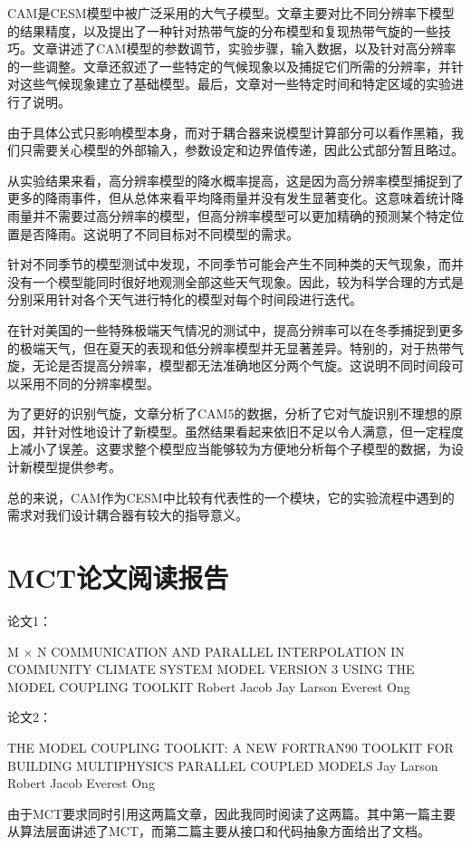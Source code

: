 CAM是CESM模型中被广泛采用的大气子模型。文章主要对比不同分辨率下模型的结果精度，以及提出了一种针对热带气旋的分布模型和复现热带气旋的一些技巧。文章讲述了CAM模型的参数调节，实验步骤，输入数据，以及针对高分辨率的一些调整。文章还叙述了一些特定的气候现象以及捕捉它们所需的分辨率，并针对这些气候现象建立了基础模型。最后，文章对一些特定时间和特定区域的实验进行了说明。

由于具体公式只影响模型本身，而对于耦合器来说模型计算部分可以看作黑箱，我们只需要关心模型的外部输入，参数设定和边界值传递，因此公式部分暂且略过。

从实验结果来看，高分辨率模型的降水概率提高，这是因为高分辨率模型捕捉到了更多的降雨事件，但从总体来看平均降雨量并没有发生显著变化。这意味着统计降雨量并不需要过高分辨率的模型，但高分辨率模型可以更加精确的预测某个特定位置是否降雨。这说明了不同目标对不同模型的需求。

针对不同季节的模型测试中发现，不同季节可能会产生不同种类的天气现象，而并没有一个模型能同时很好地观测全部这些天气现象。因此，较为科学合理的方式是分别采用针对各个天气进行特化的模型对每个时间段进行迭代。

在针对美国的一些特殊极端天气情况的测试中，提高分辨率可以在冬季捕捉到更多的极端天气，但在夏天的表现和低分辨率模型并无显著差异。特别的，对于热带气旋，无论是否提高分辨率，模型都无法准确地区分两个气旋。这说明不同时间段可以采用不同的分辨率模型。

为了更好的识别气旋，文章分析了CAM5的数据，分析了它对气旋识别不理想的原因，并针对性地设计了新模型。虽然结果看起来依旧不足以令人满意，但一定程度上减小了误差。这要求整个模型应当能够较为方便地分析每个子模型的数据，为设计新模型提供参考。

总的来说，CAM作为CESM中比较有代表性的一个模块，它的实验流程中遇到的需求对我们设计耦合器有较大的指导意义。

\section{MCT论文阅读报告}

论文1：

M × N COMMUNICATION AND PARALLEL INTERPOLATION IN COMMUNITY CLIMATE SYSTEM MODEL VERSION 3 USING THE MODEL COUPLING TOOLKIT Robert Jacob Jay Larson Everest Ong

论文2：

THE MODEL COUPLING TOOLKIT: A NEW FORTRAN90 TOOLKIT FOR BUILDING MULTIPHYSICS PARALLEL COUPLED MODELS Jay Larson Robert Jacob Everest Ong

	由于MCT要求同时引用这两篇文章，因此我同时阅读了这两篇。其中第一篇主要从算法层面讲述了MCT，而第二篇主要从接口和代码抽象方面给出了文档。

